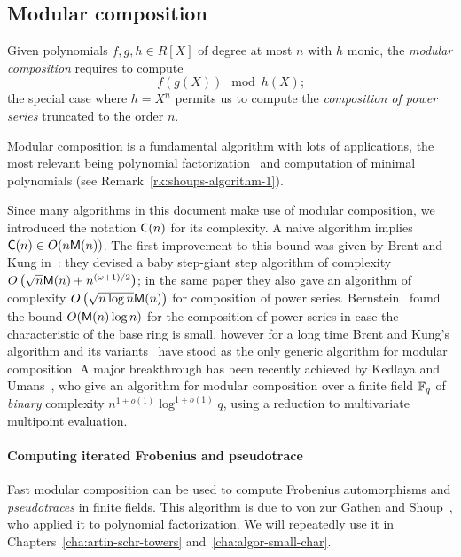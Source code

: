 \subsection{Modular composition}
\label{sec:modular-composition}
Given polynomials $f,g,h\in R[X]$ of degree at most $n$ with $h$
monic, the \emph{modular composition}
requires to compute
\begin{equation}
  \label{eq:190}
  f(g(X)) \mod h(X)
  \text{;}
\end{equation}
the special case where $h=X^n$ permits us to compute the
\emph{composition of power
  series} truncated to the order $n$.

Modular composition is a fundamental algorithm with lots of
applications, the most relevant being polynomial
factorization~\cite{vzgathen+shoup92,kaltofen+shoup98} and computation
of minimal polynomials (see Remark~\ref{rk:shoups-algorithm-1}).

Since many algorithms in this document make use of modular
composition, we introduced the notation $\mathsf{C}(n)$ for its
complexity. A naive algorithm implies $\mathsf{C}(n)\in
O(n\mathsf{M}(n))$. The first improvement to this bound was given by Brent
and Kung in~\cite{brent+kung}: they devised a baby step-giant step
algorithm of complexity $O\left(\sqrt{n}\mathsf{M}(n) +
  n^{(\omega+1)/2}\right)$; in the same paper they also gave an
algorithm of complexity $O\left(\sqrt{n\log n}\mathsf{M}(n)\right)$ for
composition of power series. Bernstein~\cite{bernstein98} found the
bound $O(\mathsf{M}(n)\log n)$ for the composition of power series in case
the characteristic of the base ring is small, however for a long time
Brent and Kung's algorithm and its
variants~\cite{huang+pan98,kaltofen+shoup98} have stood as the only
generic algorithm for modular composition. A major breakthrough has
been recently achieved by Kedlaya and
Umans~\cite{umans:08,kedlaya+umans08}, who give an algorithm for
modular composition over a finite field $\mathbb{F}_q$ of \emph{binary}
complexity $n^{1+o(1)}\log^{1+o(1)}q$, using a reduction to
multivariate multipoint evaluation.


\paragraph{Computing iterated Frobenius and pseudotrace}
\label{sec:comp-frob-trace}
Fast modular composition can be used to compute Frobenius
automorphisms and \emph{pseudotraces} in finite fields. This algorithm
is due to von zur Gathen and Shoup~\cite{vzgathen+shoup92}, who
applied it to polynomial factorization. We will repeatedly use it in
Chapters~\ref{cha:artin-schr-towers} and~\ref{cha:algor-small-char}.

